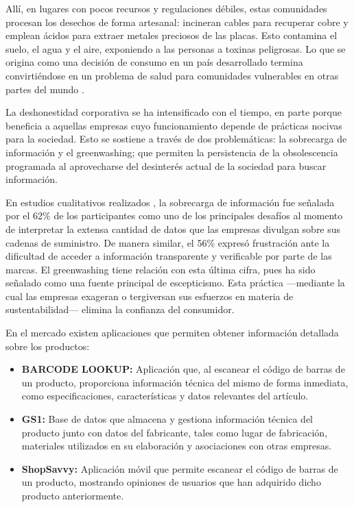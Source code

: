 Allí, en lugares con pocos recursos y regulaciones débiles, estas comunidades
procesan los desechos de forma artesanal: incineran cables para recuperar cobre
y emplean ácidos para extraer metales preciosos de las placas. Esto contamina el
suelo, el agua y el aire, exponiendo a las personas a toxinas peligrosas. Lo que
se origina como una decisión de consumo en un país desarrollado termina
convirtiéndose en un problema de salud para comunidades vulnerables en otras
partes del mundo \parencite[p.~119]{unctad2024}.

La deshonestidad corporativa se ha intensificado con el tiempo, en parte porque
beneficia a aquellas empresas cuyo funcionamiento depende de prácticas nocivas
para la sociedad. Esto se sostiene a través de dos problemáticas: la sobrecarga
de información y el greenwashing; que permiten la persistencia de la
obsolescencia programada al aprovecharse del desinterés actual de la sociedad
para buscar información.

En estudios cualitativos realizados \parencite[p.~9]{holloway2025}, la
sobrecarga de información fue señalada por el 62\% de los participantes como uno
de los principales desafíos al momento de interpretar la extensa cantidad de
datos que las empresas divulgan sobre sus cadenas de suministro. De manera
similar, el 56\% expresó frustración ante la dificultad de acceder a información
transparente y verificable por parte de las marcas. El greenwashing tiene
relación con esta última cifra, pues ha sido señalado como una fuente principal
de escepticismo. Esta práctica —mediante la cual las empresas exageran o
tergiversan sus esfuerzos en materia de sustentabilidad— elimina la confianza
del consumidor. 

En el mercado existen aplicaciones que permiten obtener información detallada
sobre los productos:

\begin{itemize}
    \item \textbf{BARCODE LOOKUP:} Aplicación que, al escanear el código de
    barras de un producto, proporciona información técnica del mismo de forma
    inmediata, como especificaciones, características y datos relevantes del
    artículo.
    \item \textbf{GS1:} Base de datos que almacena y gestiona información
    técnica del producto junto con datos del fabricante, tales como lugar de
    fabricación, materiales utilizados en su elaboración y asociaciones con
    otras empresas.
    \item \textbf{ShopSavvy:} Aplicación móvil que permite escanear el código de
    barras de un producto, mostrando opiniones de usuarios que han adquirido
    dicho producto anteriormente.
\end{itemize}

